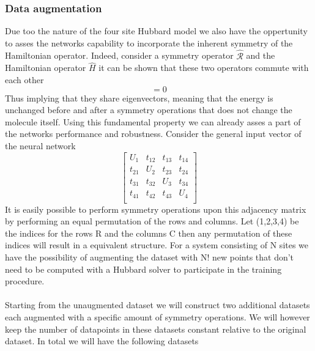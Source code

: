 \documentclass[]{article}
\begin{document}
\subsubsection{Data augmentation}
 Due too the nature of the four site Hubbard model we also have the oppertunity to asses the networks capability to incorporate the inherent symmetry of the Hamiltonian operator. Indeed, consider a symmetry operator $\hat{\mathcal{R}}$ and the Hamiltonian operator $\hat{H}$ it can be shown that these two operators commute with each other
 \begin{equation*}
 [\hat{\mathcal{R}},\hat{H}]=0
 \end{equation*}
 Thus implying that they share eigenvectors, meaning that the energy is unchanged before and after a symmetry operations that does not change the molecule itself. Using this fundamental property we can already asses a part of the networks performance and robustness. Consider the general input vector of the neural network
 \begin{equation*}
	 \begin{bmatrix}
	  U_1 & t_{12} & t_{13} & t_{14} \\
	  t_{21} & U_2 & t_{23} & t_{24} \\
	  t_{31} & t_{32} & U_3 & t_{34} \\
	  t_{41} & t_{42} & t_{43} & U_4 \\
	 \end{bmatrix}
 \end{equation*}
It is easily possible to perform symmetry operations upon this adjacency matrix by performing an equal permutation of the rows and columns. Let (1,2,3,4) be the indices for the rows R and the columns C then any permutation of these indices will result in a equivalent structure. For a system consisting of N sites we have the possibility of augmenting the dataset with N! new points that don't need to be computed with a Hubbard solver to participate in the training procedure.
\\
\\
Starting from the unaugmented dataset we will construct two additional datasets each augmented with a specific amount of symmetry operations. We will however keep the number of datapoints in these datasets constant relative to the original dataset. In total we will have the following datasets
\end{document}

